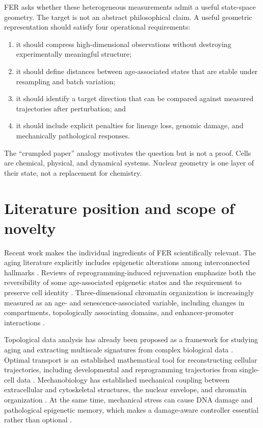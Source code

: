 \documentclass[11pt]{article}
\begin{document}
FER asks whether these heterogeneous measurements admit a useful state-space geometry. The target is not an abstract philosophical claim. A useful geometric representation should satisfy four operational requirements:
\begin{enumerate}[leftmargin=1.45em]
\item it should compress high-dimensional observations without destroying experimentally meaningful structure;
\item it should define distances between age-associated states that are stable under resampling and batch variation;
\item it should identify a target direction that can be compared against measured trajectories after perturbation; and
\item it should include explicit penalties for lineage loss, genomic damage, and mechanically pathological responses.
\end{enumerate}

The ``crumpled paper'' analogy motivates the question but is not a proof. Cells are chemical, physical, and dynamical systems. Nuclear geometry is one layer of their state, not a replacement for chemistry.

\section{Literature position and scope of novelty}
Recent work makes the individual ingredients of FER scientifically relevant. The aging literature explicitly includes epigenetic alterations among interconnected hallmarks \cite{lopezotin2023}. Reviews of reprogramming-induced rejuvenation emphasize both the reversibility of some age-associated epigenetic states and the requirement to preserve cell identity \cite{gama2018,yucel2024,li2026}. Three-dimensional chromatin organization is increasingly measured as an age- and senescence-associated variable, including changes in compartments, topologically associating domains, and enhancer-promoter interactions \cite{sun2018,ma2026}.

Topological data analysis has already been proposed as a framework for studying aging and extracting multiscale signatures from complex biological data \cite{fulop2020}. Optimal transport is an established mathematical tool for reconstructing cellular trajectories, including developmental and reprogramming trajectories from single-cell data \cite{schiebinger2019}. Mechanobiology has established mechanical coupling between extracellular and cytoskeletal structures, the nuclear envelope, and chromatin organization \cite{miroshnikova2017,lityagina2021,miroshnikova2022,kloc2025}. At the same time, mechanical stress can cause DNA damage and pathological epigenetic memory, which makes a damage-aware controller essential rather than optional \cite{qiu2025,boyle2026}.
\end{document}
